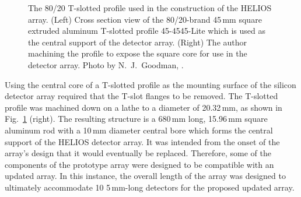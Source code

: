 \begin{figure}
\begin{center}
\end{center}
\caption[The 80/20 T-slotted profile used in the construction of the HELIOS array]{The 80/20 T-slotted profile used in the construction of the HELIOS array.  (Left) Cross section view of the 80/20-brand 45\,mm square extruded aluminum T-slotted profile 45-4545-Lite which is used as the central support of the detector array. (Right) The author machining the profile to expose the square core for use in the detector array.  Photo by N.~J.\ Goodman, \photodate{}.}
\label{80/20}
\end{figure}

Using the central core of a T-slotted profile as the mounting surface of the silicon detector array required that the T-slot flanges to be removed.  The T-slotted profile was machined down on a lathe to a diameter of 20.32\,mm, as shown in Fig.~\ref{80/20} (right).  The resulting structure is a 680\,mm long, 15.96\,mm square aluminum rod with a 10\,mm diameter central bore which forms the central support of the HELIOS detector array.
It was intended from the onset of the array's design that it would eventually be replaced.  Therefore, some of the components of the prototype array were designed to be compatible with an updated array.  In this instance, 
the overall length of the array was designed to ultimately accommodate 10 5\,mm-long detectors for the proposed updated array.  

